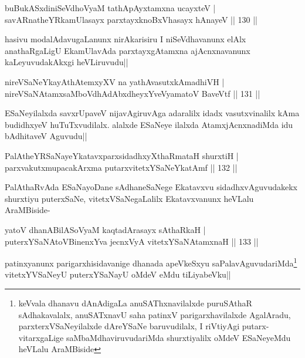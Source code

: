 \begin{shl}
buBukASxdiniSeVdhoV\s yaM tathA\s pAyxtamxna ucayxteV |\\
savARnatheYRkamUlasayx parxtayxknoBxVhasayx hAnayeV \hfill || 130 ||
\end{shl}

\begin{artha}
hasivu modalAdavugaLanunx nirAkarisiru I niSeVdhavanunx elAlx anathaRgaLigU EkamUlavAda parxtayxgAtamxna ajAcnxnavanunx kaLeyuvudakAkxgi heVLiruvudu||
\end{artha}

\begin{shl}
nireVSaNeYkayAthAtemxyXV na yathAvasutxkAmadhiVH |\\
nireVSaNAtamxsaMboVdhAdAbxdheyxYveVyamatoV BaveVtf \hfill || 131 ||
\end{shl}

\begin{artha}
ESaNeyilalxda savxrUpaveV nijavAgiruvAga adaralilx idadx vasutxvinalilx kAma budidhxyeV huTuTxvudilalx. alalxde ESaNeye ilalxda AtamxjAcnxnadiMda idu bAdhitaveV Aguvudu||
\end{artha}

\begin{shl}
PalAtheYRSaNayeYkatavxparxsidadhxyXthaRmataH shurxtiH |\\
parxvakutxmupacakArxma putarxvitetxYSaNeYkatAmf \hfill || 132 ||
\end{shl}

\begin{artha}
PalAthaRvAda ESaNayoDane sAdhaneSaNege Ekatavxvu sidadhxvAguvudakekx shurxtiyu puterxSaNe, vitetxVSaNegaLalilx Ekatavxvanunx heVLalu AraMBiside-
\end{artha}


\begin{shl}
yatoV dhanABilASoV\s yaM kaqtadArasayx sAthaRkaH |\\
puterxYSaNA\s toV\s BinenxYva jecnxVyA vitetxYSaNAtamxnaH \hfill || 133 ||
\end{shl}

\begin{artha}
patinxyanunx parigarxhisidavanige dhanada apeVkeSxyu saPalavAguvudariMda\footnote[1]{keVvala dhanavu dAnAdigaLa anuSAThxnavilalxde puruSAthaR sAdhakavalalx, anuSATxnavU saha patinxV parigarxhavilalxde AgalAradu, parxterxVSaNeyilalxde dAreYSaNe baruvudilalx, I riVtiyAgi putarx-vitarxgaLige saMbaMdhaviruvudariMda shurxtiyalilx oMdeV ESaNeyeMdu heVLalu AraMBiside} vitetxYVSaNeyU puterxYSaNayU oMdeV eMdu tiLiyabeVku||
\end{artha}

